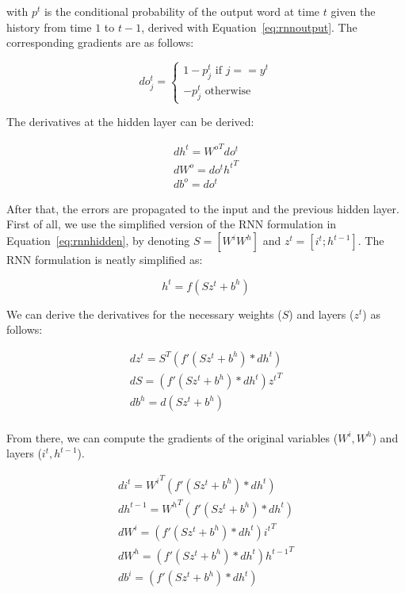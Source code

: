 with $p^t$ is the conditional probability of the output word at time $t$ given the history from time $1$ to $t-1$, derived with Equation~\ref{eq:rnnoutput}. The corresponding gradients are as follows:

\begin{equation}
do^t_j = 
\begin{cases}
1 - p^t_j \text{ if } j == y^t  \\
-p^t_j \text{     otherwise}
\end{cases}
\end{equation}

The derivatives at the hidden layer can be derived:

\begin{equation}
\begin{aligned}
dh^t = {W^o}^T do^t \\
dW^o = do^t {h^t}^T \\
db^o = do^t
\end{aligned}
\label{eq:drnn1}
\end{equation}

After that, the errors are propagated to the input and the previous hidden layer. First of all, we use the simplified version of the RNN formulation in Equation~\ref{eq:rnnhidden}, by denoting $S = [W^iW^h]$ and $z^t = [i^t;h^{t-1}]$. The RNN formulation is neatly simplified as:

\begin{equation}
h^t = f(Sz^t + b^h)
\end{equation}

We can derive the derivatives for the necessary weights ($S$) and layers ($z^t$) as follows:

\begin{equation}
\begin{aligned}
dz^t = S^T (f'(Sz^t + b^h) * dh^t) \\
dS = (f'(Sz^t + b^h) * dh^t) {z^t}^T \\
db^h = d(Sz^t + b^h) \\
\end{aligned}
\label{eq:drnn2}
\end{equation}

From there, we can compute the gradients of the original variables ($W^i, W^h$) and layers ($i^t, h^{t-1}$). 

\begin{equation}
\begin{aligned}
di^t = {W^i}^T (f'(Sz^t + b^h) * dh^t) \\
dh^{t-1} = {W^h}^T (f'(Sz^t + b^h) * dh^t) \\
dW^i = (f'(Sz^t + b^h) * dh^t) {i^t}^T \\
dW^h = (f'(Sz^t + b^h) * dh^t) {h^{t-1}}^T \\
db^i = (f'(Sz^t + b^h) * dh^t)
\end{aligned}
\label{eq:drnn3}
\end{equation}

